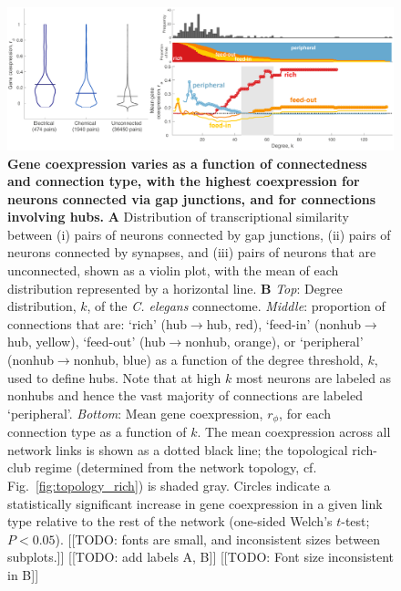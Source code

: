 \documentclass[10pt,letterpaper]{article}
\begin{document}
 \begin{figure}[h]
 \centering
    \includegraphics[width=1\textwidth]{MeanCoexpressionALL.pdf}
\caption{{\bf Gene coexpression varies as a function of connectedness and connection type, with the highest coexpression for neurons connected via gap junctions, and for connections involving hubs.}
\textbf{A} Distribution of transcriptional similarity between (i) pairs of neurons connected by gap junctions, (ii) pairs of neurons connected by synapses, and (iii) pairs of neurons that are unconnected, shown as a violin plot, with the mean of each distribution represented by a horizontal line.
\textbf{B}
\emph{Top}: Degree distribution, $k$, of the \emph{C. elegans} connectome.
\emph{Middle}: proportion of connections that are:
`rich' (hub$\rightarrow$hub, red),
`feed-in' (nonhub$\rightarrow$hub, yellow),
`feed-out' (hub$\rightarrow$nonhub, orange), or
`peripheral' (nonhub$\rightarrow$nonhub, blue) as a function of the degree threshold, $k$, used to define hubs.
Note that at high $k$ most neurons are labeled as nonhubs and hence the vast majority of connections are labeled `peripheral'.
 \emph{Bottom}: Mean gene coexpression, $r_\phi$, for each connection type as a function of $k$.
 The mean coexpression across all network links is shown as a dotted black line; the topological rich-club regime (determined from the network topology, cf. Fig.~\ref{fig:topology_rich}) is shaded gray.
Circles indicate a statistically significant increase in gene coexpression in a given link type relative to the rest of the network (one-sided Welch's $t$-test; $P < 0.05$).
[[TODO: fonts are small, and inconsistent sizes between subplots.]]
[[TODO: add labels A, B]]
[[TODO: Font size inconsistent in B]]
}

 \label{fig:coExp}
\end{figure}
\end{document}
